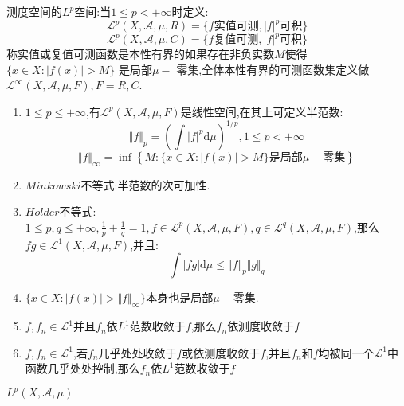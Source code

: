 测度空间的$L^p$空间:当$1\le p<+\infty$时定义:
$$\mathscr{L}^p(X,\mathscr{A},\mu,R)=\{f\text{实值可测},|f| ^p\text{可积}\}$$
$$\mathscr{L}^p(X,\mathscr{A},\mu,C)=\{f\text{复值可测},|f| ^p\text{可积}\}$$
称实值或复值可测函数是本性有界的如果存在非负实数$M$使得$\{x\in X:|f(x)|>M\}$ 是局部$\mu-$ 零集,全体本性有界的可测函数集定义做$\mathscr{L}^{\infty}(X,\mathscr{A},\mu,F),F=R,C$.

\begin{enumerate}
  \item $1\le p\le+\infty$,有$\mathscr{L}^p(X,\mathscr{A},\mu,F)$是线性空间,在其上可定义半范数:
  $$\Vert f\Vert_p=\left(\int |f|^p\mathrm{d}\mu\right)^{1/p},1\le p<+\infty$$
  $$\Vert f\Vert_{\infty}=\inf\left\{M:\{x\in X:|f(x)|>M\}\text{是局部}\mu-\text{零集}\right\}$$
  \item $Minkowski$不等式:半范数的次可加性.
  \item $Holder$不等式:$1\le p,q\le+\infty,\frac{1}{p}+\frac{1}{q}=1,f\in\mathscr{L}^p(X,\mathscr{A},\mu,F),
  q\in\mathscr{L}^q(X,\mathscr{A},\mu,F)$,那么$fg\in\mathscr{L} ^1(X,\mathscr{A},\mu,F)$,并且:
  $$\int |fg|\mathrm{d}\mu\le\Vert f\Vert_p\Vert g\Vert_q$$
  \item $\{x\in X:|f(x)|>\Vert f\Vert_{\infty}\}$本身也是局部$\mu-$零集.
  \item $f,f_n\in \mathscr{L}^1$并且$f_n$依$L^1$范数收敛于$f$,那么$f_n$依测度收敛于$f$
  \item $f,f_n\in \mathscr{L}^1$,若$f_n$几乎处处收敛于$f$或依测度收敛于$f$,并且$f_n$和$f$均被同一个$\mathscr{L}^1$中函数几乎处处控制,那么$f_n$依$L^1$范数收敛于$f$
\end{enumerate}

$L^p(X,\mathscr{A},\mu)$

